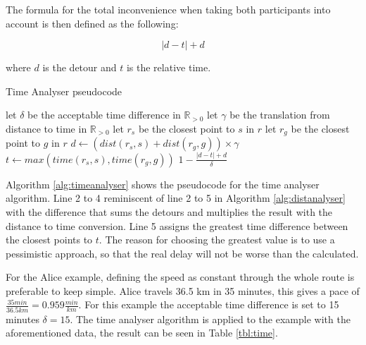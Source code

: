 The formula for the total inconvenience when taking both participants into account is then defined as the following:

\[ |d - t| + d \]

where $d$ is the detour \DIFaddbegin {}\DIFaddend and $t$ is the relative time.

\begin{algorithm}
	\caption{Time Analyser pseudocode}
	\label{alg:timeanalyser}
	\begin{algorithmic}[1]
		\Require 
		\Statex let $\delta$ be the acceptable time difference in $\mathbb{R}_{>0}$
		\Statex let $\gamma$ be the translation from distance to time in $\mathbb{R}_{>0}$ 
		\Statex 
			\State let $r_s$ be the closest point to $s$ in $r$
			\State let $r_g$ be the closest point to $g$ in $r$
			\State $d \gets (dist(r_s,s) + dist(r_g,g))\times\gamma$
			\State $t \gets max(time(r_s, s), time(r_g, g))$
			\State\Return $1-\frac{|d - t| + d}{\delta}$
		\EndFunction
	\end{algorithmic}
\end{algorithm}

Algorithm \ref{alg:timeanalyser} shows the pseudocode for the time analyser algorithm.
Line 2 to 4 \DIFdelbegin {}\DIFdelend \DIFaddbegin {}\DIFaddend reminiscent of line 2 to 5 in Algorithm \ref{alg:distanalyser} with the difference that \DIFdelbegin {}\DIFdelend \DIFaddbegin {}\DIFaddend sums the detours and multiplies the result with the distance to time conversion.
Line 5 assigns the greatest time difference between the closest points to $t$.
The reason for choosing the greatest value is to use a pessimistic approach, so that the real delay will not be worse than the calculated.

For the Alice example, defining the speed as constant through the whole route is preferable to keep \DIFdelbegin {}\DIFdelend \DIFaddbegin {}\DIFaddend simple.
Alice travels 36.5 km in 35 minutes, this gives a pace of  $\frac{35 min}{36.5 km} = 0.959\frac{min}{km} $.
For this example the acceptable time difference is set to 15 minutes $\delta = 15$.
The time analyser algorithm is applied to the example with the aforementioned data, the result can be seen in Table \ref{tbl:time}.

